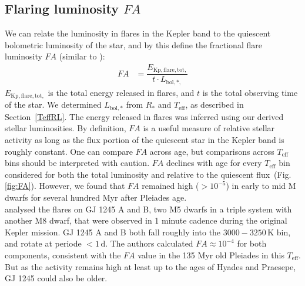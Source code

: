 \documentclass{aa}
\begin{document}
\subsection{Flaring luminosity $FA$}
\label{sec:fa}
We can relate the luminosity in flares in the Kepler band to the quiescent bolometric luminosity of the star, and by this define the fractional flare luminosity $FA$ (similar to ):
\begin{align}
\label{eq:FA}
FA&=\dfrac{E_\mathrm{Kp,flare,tot,}}{t\cdot L_{\mathrm{bol,*,}}}
\end{align}
$E_\mathrm{Kp,flare,tot,}$ is the total energy released in flares, and $t$ is the total observing time of the star.
We determined $L_\mathrm{bol,*}$ from $R_*$ and $T_\mathrm{eff}$, as described in Section~\ref{TeffRL}. The energy released in flares was inferred using our derived stellar luminosities. By definition, $FA$ is a useful measure of relative stellar activity as long as the flux portion of the quiescent star in the Kepler band is roughly constant. One can compare $FA$ across age, but comparisons across $T_\mathrm{eff}$ bins should be interpreted with caution. $FA$ declines with age for every $T_\mathrm{eff}$ bin considered for both the total luminosity and relative to the quiescent flux~(Fig. \ref{fig:FA}). However, we found that $FA$ remained high ($>10^{-5}$) in early to mid M dwarfs for several hundred Myr after Pleiades age. 
\\ 
\citet{lurie2015} analysed the flares on GJ 1245 A and B, two M5 dwarfs in a triple system with another M8 dwarf, that were observed in 1 minute cadence during the original Kepler mission. GJ 1245 A and B both fall roughly into the $3000-3250\,$K bin, and rotate at periode $<1$\,d. The authors calculated $FA\approx 10^{-4}$ for both components, consistent with the $FA$ value in the 135 Myr old Pleiades in this $T_\mathrm{eff}$. But as the activity remains high at least up to the ages of Hyades and Praesepe, GJ 1245 could also be older. %
\end{document}
